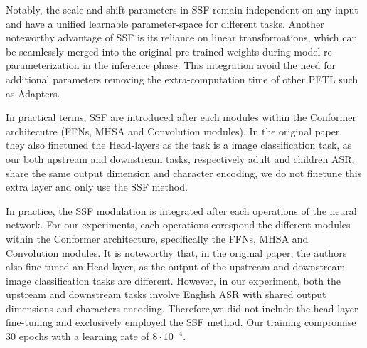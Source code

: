 Notably, the scale and shift parameters in SSF remain independent on any input and have a unified learnable parameter-space for different tasks. Another noteworthy advantage of SSF is its reliance on linear transformations, which can be seamlessly merged into the original pre-trained weights during model re-parameterization in the inference phase. This integration avoid the need for additional parameters removing the extra-computation time of other PETL such as Adapters.

In practical terms, SSF are introduced after each modules within the Conformer architecutre (FFNs, MHSA and Convolution modules). In the original paper, they also finetuned the Head-layers as the task is a image classification task, as our both upstream and downstream tasks, respectively adult and children ASR, share the same output dimension and character encoding, we do not finetune this extra layer and only use the SSF method. 

In practice, the SSF modulation is integrated after each operations of the neural network. For our experiments, each operations corespond the different modules within the Conformer architecture, specifically the FFNs, MHSA and Convolution modules. It is noteworthy that, in the original paper, the authors also fine-tuned an Head-layer, as the output of the upstream and downstream image classification tasks are different. However, in our experiment, both the upstream and downstream tasks involve English ASR with shared output dimensions and characters encoding. Therefore,we did not include the head-layer fine-tuning and exclusively employed the SSF method. Our training compromise 30 epochs with a learning rate of $8\cdot10^{-4}$.


